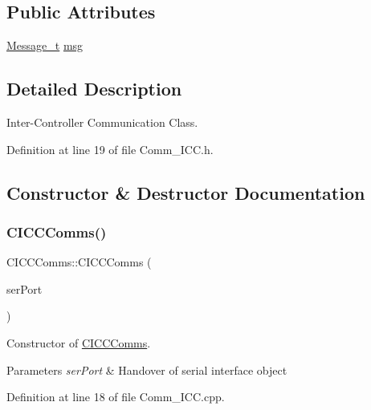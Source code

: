 \subsection*{Public Attributes}
\begin{DoxyCompactItemize}
\item 
\mbox{\hyperlink{struct_c_i_c_c_comms_1_1_message__t}{Message\+\_\+t}} \mbox{\hyperlink{class_c_i_c_c_comms_a35a59d11110d830b70ab5e2a5644bbb9}{msg}}
\end{DoxyCompactItemize}


\subsection{Detailed Description}
Inter-\/\+Controller Communication Class. 

Definition at line 19 of file Comm\+\_\+\+I\+C\+C.\+h.



\subsection{Constructor \& Destructor Documentation}
\mbox{\label{class_c_i_c_c_comms_af2cb9bb6ab473bc5ea2b4aa2f98084ff}} 
\subsubsection{\texorpdfstring{CICCComms()}{CICCComms()}}
{\footnotesize\ttfamily C\+I\+C\+C\+Comms\+::\+C\+I\+C\+C\+Comms (\begin{DoxyParamCaption}\item[{\mbox{\hyperlink{class_c_serial}{C\+Serial}} \&}]{ser\+Port }\end{DoxyParamCaption})}



Constructor of \mbox{\hyperlink{class_c_i_c_c_comms}{C\+I\+C\+C\+Comms}}. 


\begin{DoxyParams}{Parameters}
{\em ser\+Port} & Handover of serial interface object \\
\hline
\end{DoxyParams}


Definition at line 18 of file Comm\+\_\+\+I\+C\+C.\+cpp.

\mbox{\label{class_c_i_c_c_comms_a951ae11fd2024309bd4ecf67981287e7}} 
